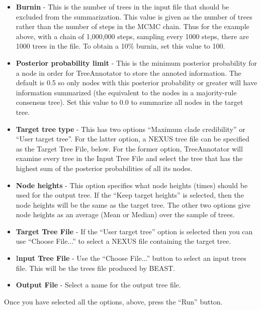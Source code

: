 \documentclass[11pt]{article}
\theoremstyle{plain}%
\theoremstyle{definition}
\theoremstyle{remark}
\begin{document}
\begin{itemize}
\item {\bf Burnin} - This is the number of trees in the input file that should be excluded from the summarization. This value is given
as the number of trees rather than the number of steps in the MCMC chain. Thus for the example above, with a chain of
1,000,000 steps, sampling every 1000 steps, there are 1000 trees in the file. To obtain a 10\% burnin, set this value to
100.
\item {\bf Posterior probability limit} - This is the minimum posterior probability for a node in order for TreeAnnotator to store the
annoted information. The default is 0.5 so only nodes with this posterior probability or greater will have information
summarized (the equivalent to the nodes in a majority-rule consensus tree). Set this value to 0.0 to summarize all nodes in
the target tree.
\item {\bf Target tree type} - This has two options ``Maximum clade credibility'' or ``User target tree''. For the latter option, a
NEXUS tree file can be specified as the Target Tree File, below. For the former option, TreeAnnotator will examine every
tree in the Input Tree File and select the tree that has the highest sum of the posterior probabilities of all its nodes.
\item {\bf Node heights} - This option specifies what node heights (times) should be used for the output tree. If the ``Keep target
heights'' is selected, then the node heights will be the same as the target tree. The other two options give node heights
as an average (Mean or Median) over the sample of trees.
\item {\bf Target Tree File} - If the ``User target tree'' option is selected then you can use ``Choose File...'' to select a NEXUS file
containing the target tree.
\item I{\bf nput Tree File} - Use the ``Choose File...'' button to select an input trees file. This will be the trees file produced by
BEAST.
\item {\bf Output File} - Select a name for the output tree file.
\end{itemize}

Once you have selected all the options, above, press the ``Run'' button. 
\end{document}
